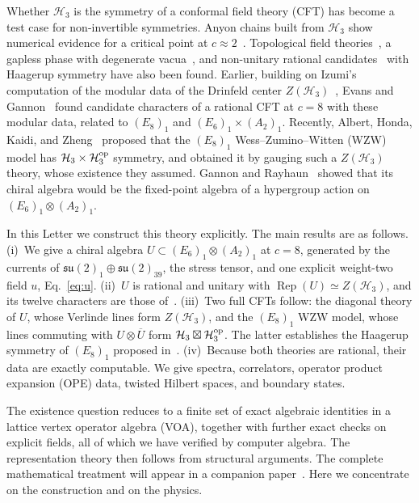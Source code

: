 \documentclass[aps,prl,twocolumn,superscriptaddress,nofootinbib]{revtex4-2}
\newcommand{\cH}{\mathcal H}
\newcommand{\su}{\mathfrak{su}}
\newcommand{\Rep}{\operatorname{Rep}}
\begin{document}
Whether $\cH_3$ is the symmetry of a conformal field theory (CFT) has
become a test case for non-invertible symmetries. Anyon chains built
from $\cH_3$ show numerical evidence for a critical point at
$c\approx2$~\cite{Wolf,HLOTT,VLVWOHV,LZR,HJSWZ}. Topological field
theories~\cite{HL,HLS}, a gapless phase with degenerate
vacua~\cite{BSN}, and non-unitary rational candidates~\cite{GKL} with
Haagerup symmetry have also been found. Earlier, building on Izumi's computation of the modular data of the
Drinfeld center $Z(\cH_3)$~\cite{Izumi}, Evans and Gannon~\cite{EG}
found candidate characters of a rational CFT at $c=8$ with these
modular data, related to $(E_8)_1$ and $(E_6)_1\times(A_2)_1$. Recently, Albert,
Honda, Kaidi, and Zheng~\cite{AHKZ} proposed that the $(E_8)_1$
Wess--Zumino--Witten (WZW) model has $\cH_3\times\cH_3^{\rm op}$
symmetry, and obtained it by gauging such a $Z(\cH_3)$ theory, whose
existence they assumed. Gannon and Rayhaun~\cite{GR} showed that its
chiral algebra would be the fixed-point algebra of a hypergroup action
on $(E_6)_1\otimes(A_2)_1$.

In this Letter we construct this theory explicitly. The main results are
as follows. (i)~We give a chiral algebra $U\subset(E_6)_1\otimes(A_2)_1$
at $c=8$, generated by the currents of $\su(2)_1\oplus\su(2)_{39}$, the
stress tensor, and one explicit weight-two field $u$,
Eq.~\eqref{eq:u}. (ii)~$U$ is rational and unitary with
$\Rep(U)\simeq Z(\cH_3)$, and its twelve characters are those
of~\cite{EG}. (iii)~Two full CFTs follow: the diagonal theory of $U$,
whose Verlinde lines form $Z(\cH_3)$, and the $(E_8)_1$ WZW model, whose
lines commuting with $U\otimes\overline U$ form
$\cH_3\boxtimes\cH_3^{\rm op}$. The latter establishes the Haagerup
symmetry of $(E_8)_1$ proposed in~\cite{AHKZ}. (iv)~Because both
theories are rational, their data are exactly computable. We give
spectra, correlators, operator product expansion (OPE) data, twisted
Hilbert spaces, and boundary states.

The existence question reduces to a finite set of exact algebraic
identities in a lattice vertex operator algebra (VOA), together with
further exact checks on explicit fields, all of which we have verified
by computer algebra. The representation theory then follows from
structural arguments. The complete mathematical treatment will
appear in a companion paper~\cite{companion}. Here we concentrate on
the construction and on the physics.
\end{document}

